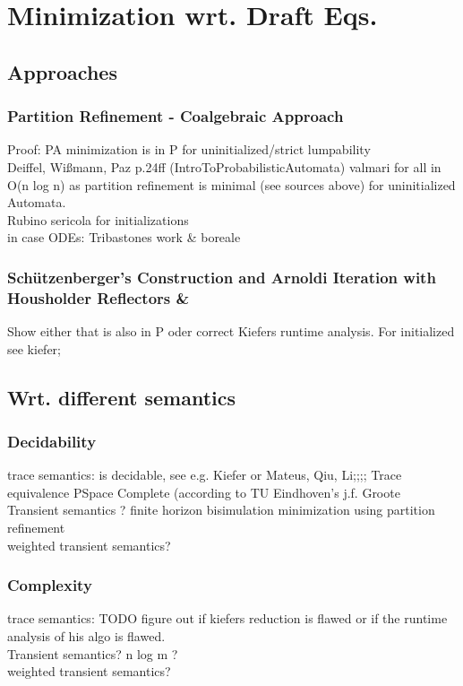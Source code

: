     \section{Minimization wrt. Draft Eqs.}
        \subsection{Approaches}
            \subsubsection{Partition Refinement - Coalgebraic Approach}
            Proof: PA minimization is in P for uninitialized/strict lumpability \\
            Deiffel, Wißmann, Paz p.24ff (IntroToProbabilisticAutomata) valmari
            for all in O(n log n) as partition refinement is minimal (see sources above) for uninitialized Automata. \\
            Rubino sericola for initializations \\
            in case ODEs: Tribastones work \& boreale
        
            \subsubsection{Schützenberger's Construction and Arnoldi Iteration with Housholder Reflectors \& }
            Show either that is also in P oder correct Kiefers runtime analysis.
            For initialized see kiefer; 
            
        \subsection{Wrt. different semantics}
            \subsubsection{Decidability}
            trace semantics: is decidable, see e.g. Kiefer or Mateus, Qiu, Li;;;; Trace equivalence PSpace Complete (according to TU Eindhoven's j.f. Groote \\
            Transient semantics ? finite horizon bisimulation minimization using partition refinement \\
            weighted transient semantics? \\
            
            \subsubsection{Complexity}
            trace semantics: TODO figure out if kiefers reduction is flawed or if the runtime analysis of his algo is flawed. \\
            Transient semantics? n log m ?\\
            weighted transient semantics? \\
            
    
